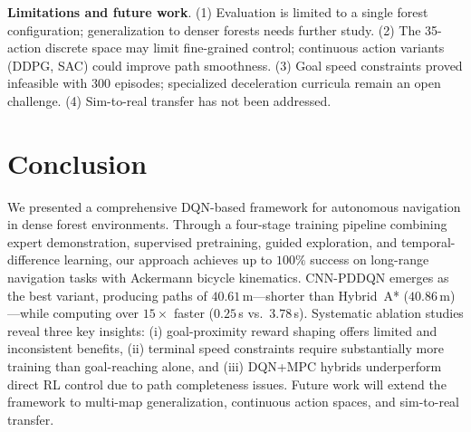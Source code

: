 \documentclass[conference]{IEEEtran}
\begin{document}
\textbf{Limitations and future work}.
(1) Evaluation is limited to a single forest configuration; generalization to denser forests needs further study.
(2) The 35-action discrete space may limit fine-grained control; continuous action variants (DDPG, SAC) could improve path smoothness.
(3) Goal speed constraints proved infeasible with 300 episodes; specialized deceleration curricula remain an open challenge.
(4) Sim-to-real transfer has not been addressed.

\section{Conclusion}\label{sec:conclusion}

We presented a comprehensive DQN-based framework for autonomous navigation in dense forest environments.
Through a four-stage training pipeline combining expert demonstration, supervised pretraining, guided exploration, and temporal-difference learning, our approach achieves up to $100\%$ success on long-range navigation tasks with Ackermann bicycle kinematics.
CNN-PDDQN emerges as the best variant, producing paths of $40.61$\,m---shorter than Hybrid~A* ($40.86$\,m)---while computing over $15\times$ faster ($0.25$\,s vs.\ $3.78$\,s).
Systematic ablation studies reveal three key insights: (i) goal-proximity reward shaping offers limited and inconsistent benefits, (ii) terminal speed constraints require substantially more training than goal-reaching alone, and (iii) DQN+MPC hybrids underperform direct RL control due to path completeness issues.
Future work will extend the framework to multi-map generalization, continuous action spaces, and sim-to-real transfer.



\end{document}

